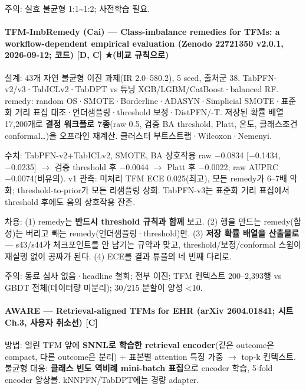 \par\noindent \textbullet\enspace 주의: 실효 불균형 1:1\textasciitilde{}1:2; 사전학습 필요.


\paragraph{TFM-ImbRemedy (Cai) — Class-imbalance remedies for TFMs: a workflow-dependent empirical evaluation (Zenodo 22721350 v2.0.1, 2026-09-12; 코드) [D, C] ★(비교 규칙으로)}
\par\noindent \textbullet\enspace 설계: 43개 자연 불균형 이진 과제(IR 2.0–580.2), 5 seed, 출처군 38. TabPFN-v2/\allowbreak{}v3·TabICLv2·TabDPT vs 튜닝 XGB/\allowbreak{}LGBM/\allowbreak{}CatBoost·balanced RF. remedy: random OS·SMOTE·Borderline·ADASYN·Simplicial SMOTE·표준화 거리 표집 대조·언더샘플링·threshold 보정·DistPFN/\allowbreak{}-T. 저장된 확률 배열 17,200개로 \textbf{결정 워크플로 7종}(raw 0.5, 검증 BA threshold, Platt, 온도, 클래스조건 conformal…)을 오프라인 재계산. 클러스터 부트스트랩·Wilcoxon·Nemenyi.


\par\noindent \textbullet\enspace 수치: TabPFN-v2+\allowbreak{}TabICLv2, SMOTE, BA 상호작용 raw −0.0834 [−0.1434, −0.0235]  \ensuremath{\rightarrow}  검증 threshold 후 −0.0044  \ensuremath{\rightarrow}  Platt 후 −0.0022; raw AUPRC −0.0074(비유의). v1 관측: 미처리 TFM ECE 0.025(최고), 모든 remedy가 6–7배 악화; threshold-to-prior가 모든 리샘플링 상회. TabPFN-v3는 표준화 거리 표집에서 threshold 후에도 음의 상호작용 잔존.


\par\noindent \textbullet\enspace 차용: (1) remedy는 \textbf{반드시 threshold 규칙과 함께} 보고. (2) 행을 만드는 remedy(합성)는 버리고 빼는 remedy(언더샘플링·threshold)만. (3) \textbf{저장 확률 배열을 산출물로} — s43/\allowbreak{}s44가 체크포인트를 안 남기는 규약과 맞고, threshold/\allowbreak{}보정/\allowbreak{}conformal 스윕이 재실행 없이 공짜가 된다. (4) ECE를 결과 튜플의 네 번째 다리로.


\par\noindent \textbullet\enspace 주의: 동료 심사 없음·headline 철회; 전부 이진; TFM 컨텍스트 200–2,393행 vs GBDT 전체(데이터량 미분리); 30/\allowbreak{}215 분할이 양성 <10.


\paragraph{AWARE — Retrieval-aligned TFMs for EHR (arXiv 2604.01841; 시트 Ch.3, 사용자 취소선) [C]}
\par\noindent \textbullet\enspace 방법: 얼린 TFM 앞에 \textbf{SNNL로 학습한 retrieval encoder}(같은 outcome은 compact, 다른 outcome은 분리) +\allowbreak{} 표본별 attention 특징 가중  \ensuremath{\rightarrow}  top-k 컨텍스트. 불균형 대응: \textbf{클래스 빈도 역비례 mini-batch 표집}으로 encoder 학습, 5-fold encoder 앙상블. kNNPFN/\allowbreak{}TabDPT에는 경량 adapter.


